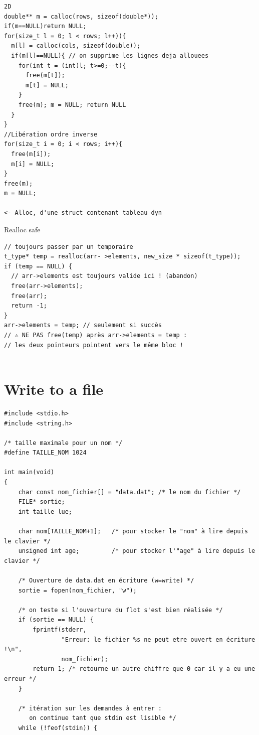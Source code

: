 \documentclass[8pt]{article}
\begin{document}
\begin{multicols*}{3}
\begin{lstlisting}
2D
double** m = calloc(rows, sizeof(double*));
if(m==NULL)return NULL;
for(size_t l = 0; l < rows; l++)){
  m[l] = calloc(cols, sizeof(double));
  if(m[l]==NULL){ // on supprime les lignes deja allouees
    for(int t = (int)l; t>=0;--t){
      free(m[t]);
      m[t] = NULL;
    }
    free(m); m = NULL; return NULL
  }
}
//Libération ordre inverse
for(size_t i = 0; i < rows; i++){
  free(m[i]);
  m[i] = NULL;
}
free(m);
m = NULL;

<- Alloc, d'une struct contenant tableau dyn 
\end{lstlisting}
Realloc safe
\begin{lstlisting}
// toujours passer par un temporaire
t_type* temp = realloc(arr- >elements, new_size * sizeof(t_type));
if (temp == NULL) {
  // arr->elements est toujours valide ici ! (abandon)
  free(arr->elements);
  free(arr);
  return -1;
}
arr->elements = temp; // seulement si succès
// ⚠ NE PAS free(temp) après arr->elements = temp :
// les deux pointeurs pointent vers le même bloc !
  
\end{lstlisting}

\section{Write to a file}
\begin{lstlisting}
#include <stdio.h>
#include <string.h>

/* taille maximale pour un nom */
#define TAILLE_NOM 1024

int main(void)
{
    char const nom_fichier[] = "data.dat"; /* le nom du fichier */
    FILE* sortie;
    int taille_lue;

    char nom[TAILLE_NOM+1];   /* pour stocker le "nom" à lire depuis le clavier */
    unsigned int age;         /* pour stocker l'"age" à lire depuis le clavier */

    /* Ouverture de data.dat en écriture (w=write) */
    sortie = fopen(nom_fichier, "w");

    /* on teste si l'ouverture du flot s'est bien réalisée */
    if (sortie == NULL) {
        fprintf(stderr,
                "Erreur: le fichier %s ne peut etre ouvert en écriture !\n",
                nom_fichier);
        return 1; /* retourne un autre chiffre que 0 car il y a eu une erreur */
    }

    /* itération sur les demandes à entrer :
       on continue tant que stdin est lisible */
    while (!feof(stdin)) {


\end{lstlisting}
\end{multicols*}
\end{document}

